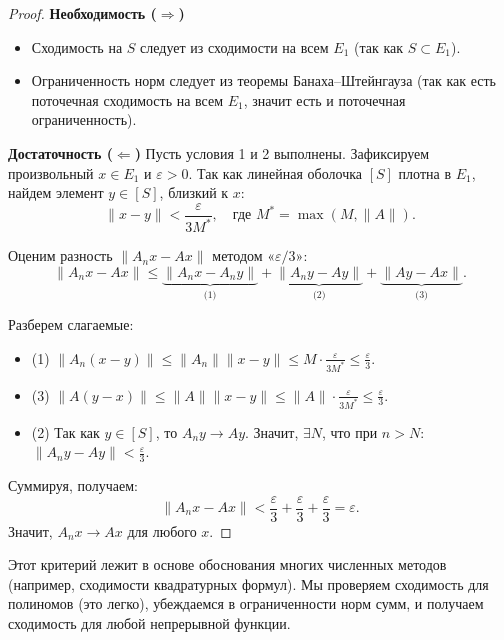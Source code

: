 \begin{proof}
	\textbf{Необходимость ($\Rightarrow$)}
	\begin{itemize}
		\item Сходимость на $S$ следует из сходимости на всем $E_1$ (так как $S \subset E_1$).
		\item Ограниченность норм следует из теоремы Банаха--Штейнгауза (так как есть поточечная сходимость на всем $E_1$, значит есть и поточечная ограниченность).
	\end{itemize}
	
	\textbf{Достаточность ($\Leftarrow$)}
	Пусть условия 1 и 2 выполнены. Зафиксируем произвольный $x \in E_1$ и $\varepsilon > 0$.
	Так как линейная оболочка $[S]$ плотна в $E_1$, найдем элемент $y \in [S]$, близкий к $x$:
	\[ \|x - y\| < \frac{\varepsilon}{3M^*}, \quad \text{где } M^* = \max(M, \|A\|). \]
	
	Оценим разность $\|A_n x - Ax\|$ методом «$\varepsilon/3$»:
	\[ \|A_n x - Ax\| \leqslant \underbrace{\|A_n x - A_n y\|}_{\text{(1)}} + \underbrace{\|A_n y - Ay\|}_{\text{(2)}} + \underbrace{\|Ay - Ax\|}_{\text{(3)}}. \]
	
	Разберем слагаемые:
	\begin{itemize}
		\item (1) $\|A_n(x - y)\| \leqslant \|A_n\| \|x - y\| \leqslant M \cdot \frac{\varepsilon}{3M^*} \leqslant \frac{\varepsilon}{3}$.
		\item (3) $\|A(y - x)\| \leqslant \|A\| \|x - y\| \leqslant \|A\| \cdot \frac{\varepsilon}{3M^*} \leqslant \frac{\varepsilon}{3}$.
		\item (2) Так как $y \in [S]$, то $A_n y \to Ay$. Значит, $\exists N$, что при $n > N$: $\|A_n y - Ay\| < \frac{\varepsilon}{3}$.
	\end{itemize}
	
	Суммируя, получаем:
	\[ \|A_n x - Ax\| < \frac{\varepsilon}{3} + \frac{\varepsilon}{3} + \frac{\varepsilon}{3} = \varepsilon. \]
	Значит, $A_n x \to Ax$ для любого $x$.
\end{proof}

\begin{idea}
	Этот критерий лежит в основе обоснования многих численных методов (например, сходимости квадратурных формул). Мы проверяем сходимость для полиномов (это легко), убеждаемся в ограниченности норм сумм, и получаем сходимость для любой непрерывной функции.
\end{idea}